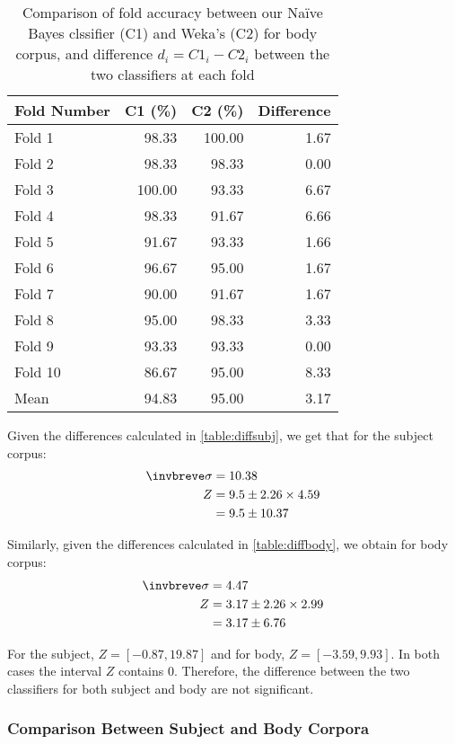 \documentclass[10pt, a4paper]{article}
\begin{document}
\begin{table}[H]
\centering
\caption{Comparison of fold accuracy between our Na\"ive Bayes clssifier (C1) and Weka's (C2) for body corpus, and difference $d_{i} = C1_{i} - C2_{i}$ between the two classifiers at each fold}
\begin{tabular}{@{}lrrr@{}}
\toprule
\textbf{Fold Number} & \textbf{C1 (\%)} & \textbf{C2 (\%)}
	& \textbf{Difference} \\
\midrule
Fold 1 & 98.33 & 100.00 & 1.67 \\
Fold 2 & 98.33 & 98.33 & 0.00 \\
Fold 3 & 100.00 & 93.33 & 6.67 \\
Fold 4 & 98.33 & 91.67 & 6.66 \\
Fold 5 & 91.67 & 93.33 & 1.66 \\
Fold 6 & 96.67 & 95.00 & 1.67 \\
Fold 7 & 90.00 & 91.67 & 1.67 \\
Fold 8 & 95.00 & 98.33 & 3.33 \\
Fold 9 & 93.33 & 93.33 & 0.00 \\
Fold 10 & 86.67 & 95.00 & 8.33 \\
\bottomrule
Mean & 94.83 & 95.00 & 3.17 \\
\bottomrule
\end{tabular}
\label{table:diffbody}
\end{table}

Given the differences calculated in \autoref{table:diffsubj}, we get that for the subject corpus:
\begin{align*}
\invbreve\sigma &= 10.38 \\
Z &= 9.5 \pm 2.26 \times 4.59 \\ &= 9.5 \pm 10.37
\end{align*}

Similarly, given the differences calculated in \autoref{table:diffbody}, we obtain for body corpus:
\begin{align*}
\invbreve\sigma &= 4.47 \\
Z &= 3.17 \pm 2.26 \times 2.99 \\ &= 3.17 \pm 6.76
\end{align*}

For the subject, $Z = [-0.87, 19.87]$ and for body, $Z = [-3.59, 9.93]$. In both cases the interval $Z$ contains 0. Therefore, the difference between the two classifiers for both subject and body are not significant.

\subsubsection{Comparison Between Subject and Body Corpora}
\end{document}
